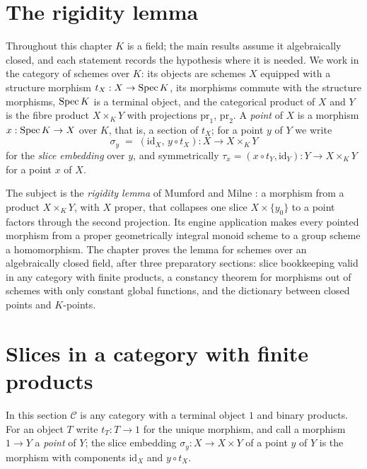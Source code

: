 \section{The rigidity lemma}
\label{pa-chap:AbelianVariety}

Throughout this chapter \(K\) is a field; the main results assume it algebraically closed,
and each statement records the hypothesis where it is needed. We work in the category of
schemes over \(K\):
its objects are schemes \(X\) equipped with a structure morphism \(t_X : X \to \operatorname{Spec} K\), its
morphisms commute with the structure morphisms, \(\operatorname{Spec} K\) is a terminal object, and the
categorical product of \(X\) and \(Y\) is the fibre product \(X \times_K Y\) with projections
\(\mathrm{pr}_1\), \(\mathrm{pr}_2\). A \emph{point} of \(X\) is a morphism
\(x : \operatorname{Spec} K \to X\) over \(K\), that is, a section of \(t_X\); for a point \(y\) of \(Y\) we
write
\[
  \sigma_y \;=\; (\mathrm{id}_X,\, y \circ t_X) : X \longrightarrow X \times_K Y
\]
for the \emph{slice embedding} over \(y\), and symmetrically
\(\tau_x = (x \circ t_Y, \mathrm{id}_Y) : Y \to X \times_K Y\) for a point \(x\) of \(X\).

The subject is the \emph{rigidity lemma} of Mumford and Milne \cite{mumford-av,milne-av}: a morphism from a product
\(X \times_K Y\), with \(X\) proper, that collapses one slice \(X \times \{y_0\}\) to a point
factors through the second projection. Its engine application makes every pointed morphism
from a proper geometrically integral monoid scheme to a group scheme a homomorphism. The
chapter proves the lemma for schemes over an algebraically closed field, after three
preparatory sections: slice bookkeeping valid in any category with finite products, a
constancy theorem for morphisms out of schemes with only constant global functions, and the
dictionary between closed points and \(K\)-points.

\section{Slices in a category with finite products}

In this section \(\mathcal C\) is any category with a terminal object \(1\) and binary
products. For an object \(T\) write \(t_T : T \to 1\) for the unique morphism, and call a
morphism \(1 \to Y\) a \emph{point} of \(Y\); the slice embedding \(\sigma_y : X \to X \times Y\)
of a point \(y\) of \(Y\) is the morphism with components \(\mathrm{id}_X\) and
\(y \circ t_X\).

